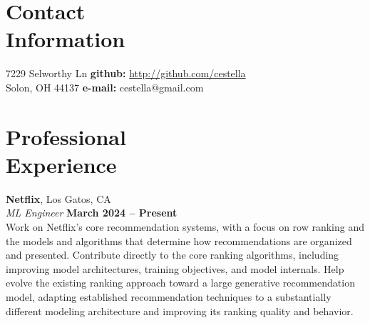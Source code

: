 \documentclass[margin,line,12pt]{resume}
\begin{document}
\begin{resume}
    \thispagestyle{empty}
    \section{\mysidestyle Contact\\Information}

    7229 Selworthy Ln \hfill {\bf github:} \url{http://github.com/cestella} \vspace{0mm}\\\vspace{0mm}%
    Solon, OH 44137 \hfill {\bf e-mail:} cestella@gmail.com       \vspace{0mm}\\\vspace{-4.5mm}%


   \section{\mysidestyle Professional\\Experience}

   \textbf{Netflix}, Los Gatos, CA\vspace{2mm}\\\vspace{1mm}%
   \textsl{ML Engineer} \hfill \textbf{March 2024 -- Present}\\
   Work on Netflix's core recommendation systems, with a focus on row ranking and the
   models and algorithms that determine how recommendations are organized and presented.
   Contribute directly to the core ranking algorithms, including improving model
   architectures, training objectives, and model internals. Help evolve the existing
   ranking approach toward a large generative recommendation model, adapting established
   recommendation techniques to a substantially different modeling architecture and
   improving its ranking quality and behavior.


\end{resume}
\end{document}
